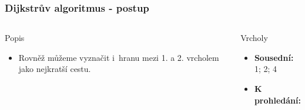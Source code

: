 \documentclass{beamer}
\begin{document}
\begin{frame}
    \frametitle{Dijkstrův algoritmus - postup}
    \begin{columns}
        \begin{block}{Popis}
            \begin{itemize}
                \item Rovněž můžeme vyznačit i~hranu mezi 1. a 2. vrcholem jako nejkratší cestu.
            \end{itemize}
        \end{block}
        \begin{block}{Vrcholy}
            \begin{itemize}
                \item \textbf{Sousední:} 1; 2; 4 
                \item \textbf{K prohledání:} 
            \end{itemize}
        \end{block}
    \end{columns}
\end{frame}
\end{document}
